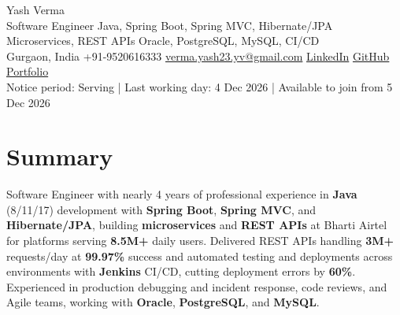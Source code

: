 \documentclass[letterpaper,10pt]{article}
\begin{document}
\begin{center}
  {\Huge Yash Verma} \\
  \small Software Engineer \textbar{} Java, Spring Boot, Spring MVC, Hibernate/JPA \textbar{} Microservices, REST APIs \textbar{} Oracle, PostgreSQL, MySQL, CI/CD \\
  \small Gurgaon, India \textbar{} +91-9520616333 \textbar{} \href{mailto:verma.yash23.yv@gmail.com}{verma.yash23.yv@gmail.com} \textbar{}
  \href{https://www.linkedin.com/in/yash-verma-9243a7193/}{LinkedIn} \textbar{}
  \href{https://github.com/yashverma230600}{GitHub} \textbar{}
  \href{https://yashverma230600.github.io/yash-portfolio/}{Portfolio} \\
  Notice period: Serving | Last working day: 4 Dec 2026 | Available to join from 5 Dec 2026
  \vspace{-8pt}
\end{center}

\section{Summary}
\begin{itemize}[leftmargin=0.15in, label={}]
  \small{\item{
    Software Engineer with nearly 4 years of professional experience in \textbf{Java} (8/11/17) development with \textbf{Spring Boot}, \textbf{Spring MVC}, and \textbf{Hibernate/JPA}, building \textbf{microservices} and \textbf{REST APIs} at Bharti Airtel for platforms serving \textbf{8.5M+} daily users. Delivered REST APIs handling \textbf{3M+} requests/day at \textbf{99.97\%} success and automated testing and deployments across environments with \textbf{Jenkins} CI/CD, cutting deployment errors by \textbf{60\%}. Experienced in production debugging and incident response, code reviews, and Agile teams, working with \textbf{Oracle}, \textbf{PostgreSQL}, and \textbf{MySQL}.
  }}
\end{itemize}
\vspace{-8pt}

\end{document}

